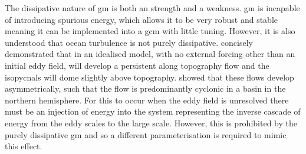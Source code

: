 \documentclass[10pt,a4paper]{article}
\begin{document}
        The dissipative nature of \gls{gm} is both an strength and a
         weakness. \gls{gm} is incapable of introducing spurious energy,
         which allows it to be very robust and stable meaning it can be implemented 
         into a \gls{gcm} with little tuning. However, it is also understood that
         ocean turbulence is not purely dissipative.
          \cite{adcock2000interactions} concisely demonstrated that
         in an idealised model, with no external forcing other
         than an initial eddy field, will develop a persistent along
         topography flow and the isopycnals will dome slightly above topography.
          \cite{nost2008asymmetry} showed that these
         flows develop asymmetrically, such that the flow is 
         predominantly cyclonic in
         a basin in the northern hemisphere. For this to occur 
         when the eddy field is unresolved there must be an 
         injection of energy into the system representing the 
         inverse cascade of energy from the eddy scales to the large scale.
         However, this is prohibited by the purely dissipative \gls{gm}
         and so a different parameterisation is required to mimic this
         effect.
         
\end{document}
